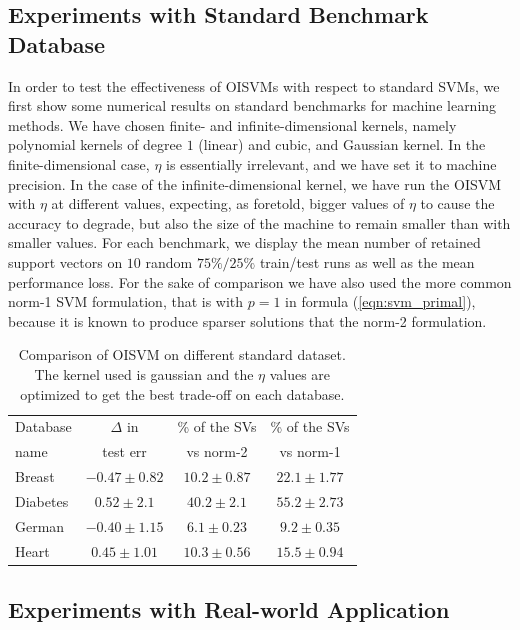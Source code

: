 \subsection*{Experiments with Standard Benchmark Database}

In order to test the effectiveness of OISVMs with respect to standard
SVMs, we first show some numerical results on standard benchmarks for machine 
learning methods. We have chosen finite- and infinite-dimensional kernels, namely
polynomial kernels of degree $1$ (linear) and cubic, and
Gaussian kernel. In the finite-dimensional case, $\eta$ is
essentially irrelevant, and we have set it to machine precision. 
In the case of the infinite-dimensional kernel, we have run the OISVM with
$\eta$ at different values, expecting, as foretold, bigger values of
$\eta$ to cause the accuracy to degrade, but also the size of the
machine to remain smaller than with smaller values.
For each benchmark, we display the mean number of retained support vectors
on $10$ random $75\%/25\%$ train/test runs as well as the mean performance loss.
For the sake of comparison we have also used the more common norm-1
SVM formulation, that is with $p=1$ in formula (\ref{eqn:svm_primal}), because
it is known to produce sparser solutions that the norm-2 formulation.

\begin{table}
\begin{center}
\begin{tabular}[!h]{|l|c|c|c|}
\hline
Database&$\Delta$ in&\% of the SVs&\% of the SVs\\
name&test err&vs norm-2&vs norm-1\\
\hline
Breast&$-0.47\pm0.82$&$10.2\pm0.87$&$22.1\pm1.77$\\
\hline
Diabetes&$0.52\pm2.1$&$40.2\pm2.1$&$55.2\pm2.73$\\
\hline
German&$-0.40\pm1.15$&$6.1\pm0.23$&$9.2\pm0.35$\\
\hline
Heart&$0.45\pm1.01$&$10.3\pm0.56$&$15.5\pm0.94$\\
\hline
\end{tabular}
\end{center}
\label{table:t1}
\caption{Comparison of OISVM on different standard dataset. The kernel used
 is gaussian and the $\eta$ values are optimized to get the best trade-off on
 each database.}
\end{table}

\subsection*{Experiments with Real-world Application}

